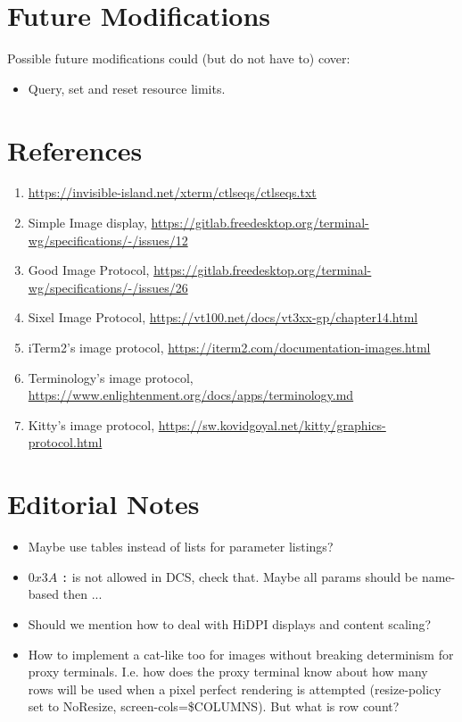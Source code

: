 \documentclass[a4paper]{article}
\newcommand{\code}[1]{\colorbox{light-gray}{\texttt{#1}}}
\begin{document}
\section{Future Modifications} %

Possible future modifications could (but do not have to) cover:

\begin{itemize}
    \item Query, set and reset resource limits.
\end{itemize}
\section{References} %

\begin{enumerate}
    \item \label{ref:ctlseqs}\url{https://invisible-island.net/xterm/ctlseqs/ctlseqs.txt}
    \item \label{ref:twg-simple-image-display}Simple Image display, \url{https://gitlab.freedesktop.org/terminal-wg/specifications/-/issues/12}
    \item \label{ref:twg-gip}Good Image Protocol, \url{https://gitlab.freedesktop.org/terminal-wg/specifications/-/issues/26}
    \item \label{ref:image-sixel}Sixel Image Protocol, \url{https://vt100.net/docs/vt3xx-gp/chapter14.html}
    \item \label{ref:image-item2}iTerm2's image protocol, \url{https://iterm2.com/documentation-images.html}
    \item \label{ref:image-terminology}Terminology's image protocol, \url{https://www.enlightenment.org/docs/apps/terminology.md} 
    \item \label{ref:image-kitty}Kitty's image protocol, \url{https://sw.kovidgoyal.net/kitty/graphics-protocol.html}
\end{enumerate}
\section{Editorial Notes} %

\begin{itemize}
    \item Maybe use tables instead of lists for parameter listings?
    \item $0x3A$ \code{:} is not allowed in DCS, check that. Maybe all params should be name-based then ...
    \item Should we mention how to deal with HiDPI displays and content scaling?
    \item How to implement a cat-like too for images without breaking determinism for proxy
        terminals. I.e. how does the proxy terminal know about how many rows will be used when
        a pixel perfect rendering is attempted (resize-policy set to NoResize,
        screen-cols=\$COLUMNS). But what is row count?
\end{itemize}

\listoftodos
\end{document}
